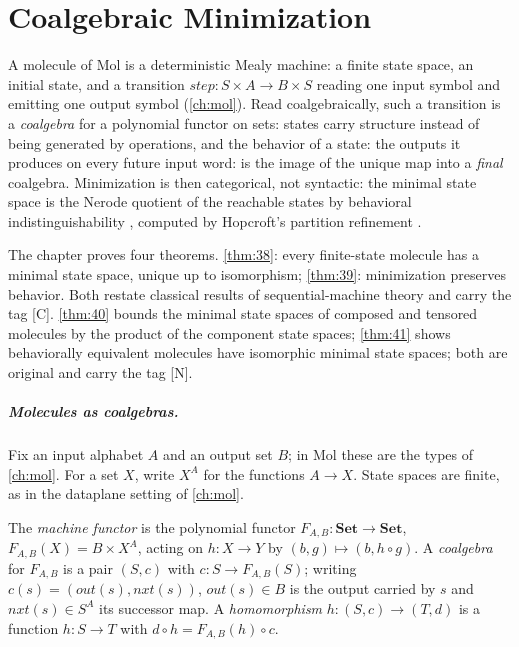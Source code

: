 \chapter{Coalgebraic Minimization}\label{ch:coalgebra}

A molecule of Mol is a deterministic Mealy machine: a finite state space, an initial
state, and a transition $\mathit{step}\colon S \times A \to B \times S$ reading one
input symbol and emitting one output symbol (\autoref{ch:mol}). Read coalgebraically,
such a transition is a \emph{coalgebra} for a polynomial functor on sets: states carry
structure instead of being generated by operations, and the behavior of a state: the
outputs it produces on every future input word: is the image of the unique map into
a \emph{final} coalgebra. Minimization is then categorical, not syntactic: the minimal
state space is the Nerode quotient of the reachable states by behavioral
indistinguishability \citep{nerode}, computed by Hopcroft's partition refinement
\citep{hopcroft}.

The chapter proves four theorems. \autoref{thm:38}: every finite-state molecule has a minimal state
space, unique up to isomorphism; \autoref{thm:39}: minimization preserves behavior. Both restate
classical results of sequential-machine theory \citep{moore,mealy} and carry the tag
[C]. \autoref{thm:40} bounds the minimal state spaces of composed and tensored molecules by the
product of the component state spaces; \autoref{thm:41} shows behaviorally equivalent molecules
have isomorphic minimal state spaces; both are original and carry the tag [N].

\paragraph{Molecules as coalgebras.}
Fix an input alphabet $A$ and an output set $B$; in Mol these are the types of
\autoref{ch:mol}. For a set $X$, write $X^A$ for the functions $A \to X$. State spaces
are finite, as in the dataplane setting of \autoref{ch:mol}.

\begin{definition}\label{def:machfun}
The \emph{machine functor} is the polynomial functor $F_{A,B}\colon \mathbf{Set} \to
\mathbf{Set}$, $F_{A,B} (X) = B \times X^A$, acting on $h\colon X \to Y$ by
$(b,g) \mapsto (b, h \circ g)$. A \emph{coalgebra} for $F_{A,B}$ is a pair $(S,c)$ with
$c \colon S \to F_{A,B} (S)$; writing $c (s) = (\mathit{out} (s), \mathit{nxt} (s))$,
$\mathit{out} (s) \in B$ is the output carried by $s$ and $\mathit{nxt} (s) \in S^A$ its
successor map. A \emph{homomorphism} $h \colon (S,c) \to (T,d)$ is a function
$h \colon S \to T$ with $d \circ h = F_{A,B} (h) \circ c$.
\end{definition}

